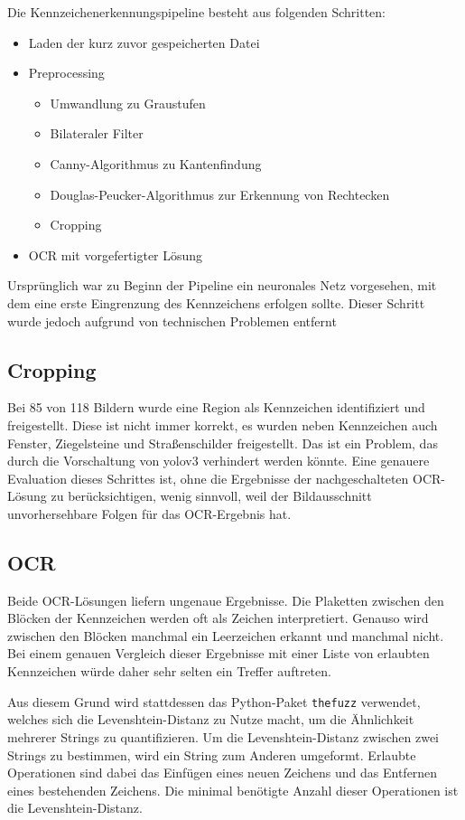 Die Kennzeichenerkennungspipeline besteht aus folgenden Schritten:

\begin{itemize}
\item Laden der kurz zuvor gespeicherten Datei
\item Preprocessing
\begin{itemize}
\item Umwandlung zu Graustufen
\item Bilateraler Filter
\item Canny-Algorithmus zu Kantenfindung
\item Douglas-Peucker-Algorithmus zur Erkennung von Rechtecken
\item Cropping
\end{itemize}
\item OCR mit vorgefertigter Lösung
\end{itemize}

Ursprünglich war zu Beginn der Pipeline ein neuronales Netz vorgesehen, mit dem eine erste Eingrenzung des Kennzeichens erfolgen sollte. Dieser Schritt wurde jedoch aufgrund von technischen Problemen entfernt


\subsection{Cropping}
Bei 85 von 118 Bildern wurde eine Region als Kennzeichen identifiziert und freigestellt.
Diese ist nicht immer korrekt, es wurden neben Kennzeichen auch Fenster, Ziegelsteine und Straßenschilder freigestellt.
Das ist ein Problem, das durch die Vorschaltung von yolov3 verhindert werden könnte. 
Eine genauere Evaluation dieses Schrittes ist, ohne die Ergebnisse der nachgeschalteten OCR-Lösung zu berücksichtigen, wenig sinnvoll, weil der Bildausschnitt unvorhersehbare Folgen für das OCR-Ergebnis hat.


\subsection{OCR}
Beide OCR-Lösungen liefern ungenaue Ergebnisse. Die Plaketten zwischen den Blöcken der Kennzeichen werden oft als Zeichen interpretiert. Genauso wird zwischen den Blöcken manchmal ein Leerzeichen erkannt und manchmal nicht.
Bei einem genauen Vergleich dieser Ergebnisse mit einer Liste von erlaubten Kennzeichen würde daher sehr selten ein Treffer auftreten.

Aus diesem Grund wird stattdessen das Python-Paket \lstinline{thefuzz} verwendet, welches sich die Levenshtein-Distanz zu Nutze macht, um die Ähnlichkeit mehrerer Strings zu quantifizieren.
Um die Levenshtein-Distanz zwischen zwei Strings zu bestimmen, wird ein String zum Anderen umgeformt. Erlaubte Operationen sind dabei das Einfügen eines neuen Zeichens und das Entfernen eines bestehenden Zeichens.
Die minimal benötigte Anzahl dieser Operationen ist die Levenshtein-Distanz.

